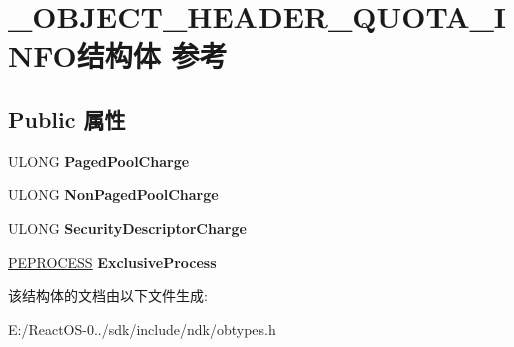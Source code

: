 \hypertarget{struct___o_b_j_e_c_t___h_e_a_d_e_r___q_u_o_t_a___i_n_f_o}{}\section{\+\_\+\+O\+B\+J\+E\+C\+T\+\_\+\+H\+E\+A\+D\+E\+R\+\_\+\+Q\+U\+O\+T\+A\+\_\+\+I\+N\+F\+O结构体 参考}
\label{struct___o_b_j_e_c_t___h_e_a_d_e_r___q_u_o_t_a___i_n_f_o}
\subsection*{Public 属性}
\begin{DoxyCompactItemize}
\item 
\mbox{\label{struct___o_b_j_e_c_t___h_e_a_d_e_r___q_u_o_t_a___i_n_f_o_a88846cf516705690d111854e677f4cf2}} 
U\+L\+O\+NG {\bfseries Paged\+Pool\+Charge}
\item 
\mbox{\label{struct___o_b_j_e_c_t___h_e_a_d_e_r___q_u_o_t_a___i_n_f_o_af206dca8d4e15277af9e68a882b445cb}} 
U\+L\+O\+NG {\bfseries Non\+Paged\+Pool\+Charge}
\item 
\mbox{\label{struct___o_b_j_e_c_t___h_e_a_d_e_r___q_u_o_t_a___i_n_f_o_ae72cf45e248ea41b4da2abe91c979fb2}} 
U\+L\+O\+NG {\bfseries Security\+Descriptor\+Charge}
\item 
\mbox{\label{struct___o_b_j_e_c_t___h_e_a_d_e_r___q_u_o_t_a___i_n_f_o_a6daaa35ebf56986a5a7eab9411a1001a}} 
\hyperlink{struct___e_p_r_o_c_e_s_s}{P\+E\+P\+R\+O\+C\+E\+SS} {\bfseries Exclusive\+Process}
\end{DoxyCompactItemize}


该结构体的文档由以下文件生成\+:\begin{DoxyCompactItemize}
\item 
E\+:/\+React\+O\+S-\/0../sdk/include/ndk/obtypes.\+h\end{DoxyCompactItemize}
